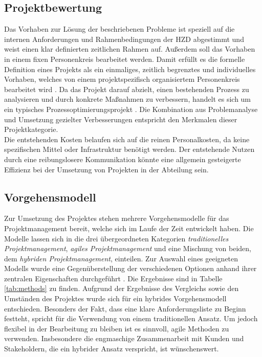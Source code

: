 \documentclass[ThesisDJ.tex]{subfiles}
\begin{document}
	\subsection{Projektbewertung}
  Das Vorhaben zur Lösung der beschriebenen Probleme ist speziell auf die internen Anforderungen und Rahmenbedingungen der HZD abgestimmt 
  und weist einen klar definierten zeitlichen Rahmen auf. Außerdem soll das Vorhaben in einem fixen Personenkreis bearbeitet werden.
  Damit erfüllt es die formelle Definition eines Projekts als ein einmaliges, zeitlich begrenztes und individuelles Vorhaben,
  welches von einem projektspezifisch organisiertem Personenkreis bearbeitet wird \cite{bronimann_projektmanagement_2022} \cite[S.~5]{dechange_projektmanagement_2024}. 
  Da das Projekt darauf abzielt, einen bestehenden Prozess zu analysieren und durch konkrete Maßnahmen zu verbessern, 
  handelt es sich um ein typisches Prozessoptimierungsprojekt \cite[S.~8]{kuster_handbuch_2022}. Die Kombination aus Problemanalyse und Umsetzung 
  gezielter Verbesserungen entspricht den Merkmalen dieser Projektkategorie. \\

  Die entstehenden Kosten belaufen sich auf die reinen Personalkosten, da keine spezifischen Mittel oder Infrastruktur benötigt werden. Der entstehende
  Nutzen durch eine reibungslosere Kommunikation könnte eine allgemein gesteigerte Effizienz bei der Umsetzung von Projekten in der Abteilung sein. 

  \subsection{Vorgehensmodell}
  Zur Umsetzung des Projektes stehen mehrere Vorgehensmodelle für das Projektmanagement bereit, welche sich im Laufe der Zeit entwickelt haben. Die Modelle lassen sich in die 
  drei übergeordneten Kategorien \emph{traditionelles Projektmanagement}, \emph{agiles Projektmanagement} und eine Mischung von beiden, dem \emph{hybriden Projektmanagement},
  einteilen. Zur Auswahl eines geeigneten Modells wurde eine Gegenüberstellung der verschiedenen Optionen anhand ihrer zentralen Eigenschaften durchgeführt \cite[S.~405ff]{wysocki_effective_nodate} \cite[S.~15ff]{kuster_handbuch_2022}. Die Ergebnisse sind in 
  Tabelle \ref{tab:methods} zu finden. Aufgrund der Ergebnisse des Vergleichs sowie den Umständen des Projektes wurde sich für ein hybrides Vorgehensmodell entschieden.
  Besonders der Fakt, dass eine klare Anforderungsliste zu Beginn festteht, spricht für die Verwendung von einem traditionellen Ansatz. Um jedoch flexibel in der Bearbeitung zu bleiben ist es sinnvoll,
  agile Methoden zu verwenden. Insbesondere die engmaschige Zusammenarbeit mit Kunden und Stakeholdern, die ein hybrider Ansatz verspricht, ist wünschenswert.
\end{document}

